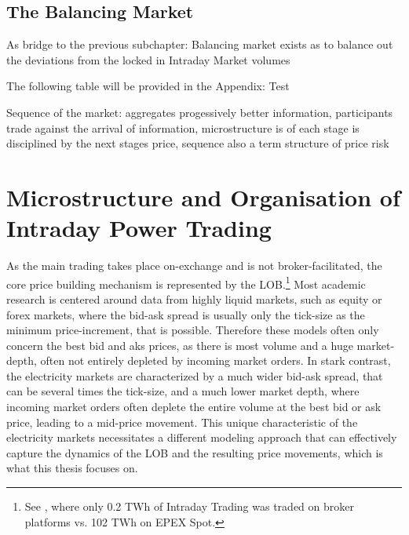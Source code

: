 \documentclass[12pt,a4paper]{cau_thesis}
\begin{document}

\subsection{The Balancing Market}\label{sub_sec:balancing_market}
As bridge to the previous subchapter: Balancing market exists as to
balance out the deviations from the locked in Intraday Market volumes

The following table will be provided in the Appendix: Test

Sequence of the market: aggregates progessively better information,
participants trade against the arrival of information, microstructure
is of each stage is disciplined by the next stages price, sequence
also a term structure of price risk
\section{Microstructure and Organisation of Intraday Power Trading}\label{sec:microstructure_and_organisation_of_power_trading}
As the main trading takes place on-exchange and is not
broker-facilitated, the core price building mechanism is represented
by the LOB.\footnote{See \cite{bnetza_monitoringreport_energy_2025},
    where only 0.2 TWh of Intraday Trading was traded on broker platforms
    vs. 102 TWh on EPEX Spot.} Most academic research is centered around
data from highly liquid markets, such as equity or forex markets,
where the bid-ask spread is usually only the tick-size as the minimum
price-increment, that is possible. Therefore these models often only
concern the best bid and aks prices, as there is most volume and a
huge market-depth, often not entirely depleted by incoming market
orders. In stark contrast, the electricity markets are characterized
by a much wider bid-ask spread, that can be several times the
tick-size, and a much lower market depth, where incoming market
orders often deplete the entire volume at the best bid or ask price,
leading to a mid-price movement. This unique characteristic of the
electricity markets necessitates a different modeling approach that
can effectively capture the dynamics of the LOB and the resulting
price movements, which is what this thesis focuses on.
\end{document}
